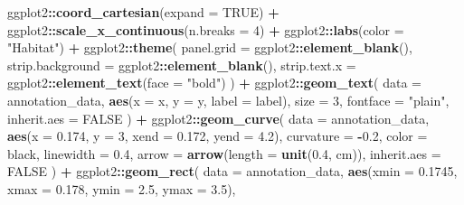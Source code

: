 \documentclass[
]{book}
\newenvironment{Shaded}{\begin{snugshade}}{\end{snugshade}}
\newcommand{\AttributeTok}[1]{\textcolor[rgb]{0.13,0.29,0.53}{#1}}
\newcommand{\ConstantTok}[1]{\textcolor[rgb]{0.56,0.35,0.01}{#1}}
\newcommand{\DecValTok}[1]{\textcolor[rgb]{0.00,0.00,0.81}{#1}}
\newcommand{\FloatTok}[1]{\textcolor[rgb]{0.00,0.00,0.81}{#1}}
\newcommand{\FunctionTok}[1]{\textcolor[rgb]{0.13,0.29,0.53}{\textbf{#1}}}
\newcommand{\NormalTok}[1]{#1}
\newcommand{\SpecialCharTok}[1]{\textcolor[rgb]{0.81,0.36,0.00}{\textbf{#1}}}
\newcommand{\StringTok}[1]{\textcolor[rgb]{0.31,0.60,0.02}{#1}}
\begin{document}
\begin{Shaded}
\begin{Highlighting}[]
\NormalTok{  ggplot2}\SpecialCharTok{::}\FunctionTok{coord\_cartesian}\NormalTok{(}\AttributeTok{expand =} \ConstantTok{TRUE}\NormalTok{) }\SpecialCharTok{+}
\NormalTok{  ggplot2}\SpecialCharTok{::}\FunctionTok{scale\_x\_continuous}\NormalTok{(}\AttributeTok{n.breaks =} \DecValTok{4}\NormalTok{) }\SpecialCharTok{+}
\NormalTok{  ggplot2}\SpecialCharTok{::}\FunctionTok{labs}\NormalTok{(}\AttributeTok{color =} \StringTok{"Habitat"}\NormalTok{) }\SpecialCharTok{+}
\NormalTok{  ggplot2}\SpecialCharTok{::}\FunctionTok{theme}\NormalTok{(}
    \AttributeTok{panel.grid =}\NormalTok{ ggplot2}\SpecialCharTok{::}\FunctionTok{element\_blank}\NormalTok{(),}
    \AttributeTok{strip.background =}\NormalTok{ ggplot2}\SpecialCharTok{::}\FunctionTok{element\_blank}\NormalTok{(),}
    \AttributeTok{strip.text.x =}\NormalTok{ ggplot2}\SpecialCharTok{::}\FunctionTok{element\_text}\NormalTok{(}\AttributeTok{face =} \StringTok{"bold"}\NormalTok{)}
\NormalTok{  ) }\SpecialCharTok{+}
\NormalTok{  ggplot2}\SpecialCharTok{::}\FunctionTok{geom\_text}\NormalTok{(}
    \AttributeTok{data =}\NormalTok{ annotation\_data,}
    \FunctionTok{aes}\NormalTok{(}\AttributeTok{x =}\NormalTok{ x, }\AttributeTok{y =}\NormalTok{ y, }\AttributeTok{label =}\NormalTok{ label),}
    \AttributeTok{size =} \DecValTok{3}\NormalTok{,}
    \AttributeTok{fontface =} \StringTok{"plain"}\NormalTok{,}
    \AttributeTok{inherit.aes =} \ConstantTok{FALSE}
\NormalTok{  ) }\SpecialCharTok{+}
\NormalTok{  ggplot2}\SpecialCharTok{::}\FunctionTok{geom\_curve}\NormalTok{(}
    \AttributeTok{data =}\NormalTok{ annotation\_data,}
    \FunctionTok{aes}\NormalTok{(}\AttributeTok{x =} \FloatTok{0.174}\NormalTok{, }\AttributeTok{y =} \DecValTok{3}\NormalTok{, }\AttributeTok{xend =} \FloatTok{0.172}\NormalTok{, }\AttributeTok{yend =} \FloatTok{4.2}\NormalTok{),}
    \AttributeTok{curvature =} \SpecialCharTok{{-}}\FloatTok{0.2}\NormalTok{,}
    \AttributeTok{color =} \StringTok{\textquotesingle{}black\textquotesingle{}}\NormalTok{,}
    \AttributeTok{linewidth =} \FloatTok{0.4}\NormalTok{,}
    \AttributeTok{arrow =} \FunctionTok{arrow}\NormalTok{(}\AttributeTok{length =} \FunctionTok{unit}\NormalTok{(}\FloatTok{0.4}\NormalTok{, }\StringTok{\textquotesingle{}cm\textquotesingle{}}\NormalTok{)),}
    \AttributeTok{inherit.aes =} \ConstantTok{FALSE}
\NormalTok{  ) }\SpecialCharTok{+}
\NormalTok{  ggplot2}\SpecialCharTok{::}\FunctionTok{geom\_rect}\NormalTok{(}
    \AttributeTok{data =}\NormalTok{ annotation\_data,}
    \FunctionTok{aes}\NormalTok{(}\AttributeTok{xmin =} \FloatTok{0.1745}\NormalTok{, }\AttributeTok{xmax =} \FloatTok{0.178}\NormalTok{, }\AttributeTok{ymin =} \FloatTok{2.5}\NormalTok{, }\AttributeTok{ymax =} \FloatTok{3.5}\NormalTok{),}

\end{Highlighting}
\end{Shaded}
\end{document}
